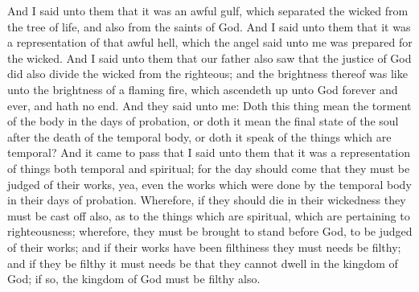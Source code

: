 And I said unto them that it was an awful gulf, which separated the wicked from the tree of life, and also from the saints of God.
\bverse \iffalse And I said unto them that it was a representation of that awful hell, which the angel said unto me was prepared for the wicked. \fi
And I said unto them that it was a representation of that awful hell, which the angel said unto me was prepared for the wicked.
\bverse \iffalse And I said unto them that our father also saw that the justice of God did also divide the wicked from the righteous; and the brightness thereof was like unto the brightness of a flaming fire, which ascendeth up unto God forever and ever, and hath no end. \fi
And I said unto them that our father also saw that the justice of God did also divide the wicked from the righteous; and the brightness thereof was like unto the brightness of a flaming fire, which ascendeth up unto God forever and ever, and hath no end.
\bverse \iffalse And they said unto me: Doth this thing mean the torment of the body in the days of probation, or doth it mean the final state of the soul after the death of the temporal body, or doth it speak of the things which are temporal? \fi
And they said unto me: Doth this thing mean the torment of the body in the days of probation, or doth it mean the final state of the soul after the death of the temporal body, or doth it speak of the things which are temporal?
\bverse \iffalse And it came to pass that I said unto them that it was a representation of things both temporal and spiritual; for the day should come that they must be judged of their works, yea, even the works which were done by the temporal body in their days of probation. \fi
And it came to pass that I said unto them that it was a representation of things both temporal and spiritual; for the day should come that they must be judged of their works, yea, even the works which were done by the temporal body in their days of probation.
\bverse \iffalse Wherefore, if they should die in their wickedness they must be cast off also, as to the things which are spiritual, which are pertaining to righteousness; wherefore, they must be brought to stand before God, to be judged of their works; and if their works have been filthiness they must needs be filthy; and if they be filthy it must needs be that they cannot dwell in the kingdom of God; if so, the kingdom of God must be filthy also. \fi
Wherefore, if they should die in their wickedness they must be cast off also, as to the things which are spiritual, which are pertaining to righteousness; wherefore, they must be brought to stand before God, to be judged of their works; and if their works have been filthiness they must needs be filthy; and if they be filthy it must needs be that they cannot dwell in the kingdom of God; if so, the kingdom of God must be filthy also.

